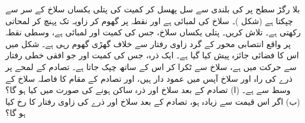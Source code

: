 بلا رگڑ سطح پر  کی بلندی سے  سل  پھسل کر   کمیت کی پتلی یکساں سلاخ کے سر سے چپکتا ہے (شکل )۔ سلاخ کی لمبائی  ہے اور  نقطہ  پر گھوم  کر زاویہ  تک پہنچ کر لمحاتی رکھتی ہے۔  تلاش کریں۔
پتلی یکساں سلاخ، جس کی کمیت  اور لمبائی  ہے، وسطی نقطہ   پر واقع انتصابی محور کے گرد   زاوی رفتار سے  خلاف گھڑی گھوم رہی ہے۔ شکل  میں اس کا فضائی جائزہ پیش کیا گیا ہے۔ ایک ذرہ، جس کی کمیت   اور جو  افقی خطی رفتار سے حرکت میں ہے، سلاخ سے ٹکرا کر اس کے ساتھ چپک جاتا ہے۔ تصادم کے لمحے پر ذرے کی راہ اور سلاخ آپس میں عمود دار ہیں، اور تصادم  کے مقام کا فاصلہ سلاخ کے وسط  سے  ہے۔ (ا)  تصادم کے بعد سلاخ اور ذرہ ساکن ہونے کی صورت میں  کیا ہو گا؟ (ب) اگر    اس قیمت سے  زیادہ ہو، تصادم کے بعد سلاخ اور ذرے کی زاوی رفتار کا رخ کیا ہو گا؟

